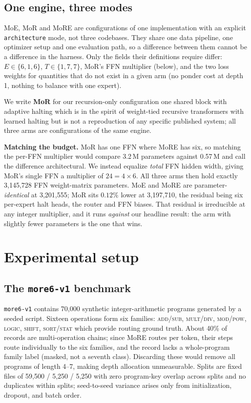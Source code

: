 \documentclass{article}
\begin{document}
\subsection{One engine, three modes}
\label{sec:engine}

MoE, MoR and MoRE are configurations of one implementation with an explicit
\texttt{architecture} mode, not three codebases. They share one data
pipeline, one optimizer setup and one evaluation path, so a difference between
them cannot be a difference in the harness. Only the fields their definitions
require differ: $E \in \{6,1,6\}$, $T \in \{1,7,7\}$, MoR's FFN multiplier
(below), and the two loss weights for quantities that do not exist in a given
arm (no ponder cost at depth 1, nothing to balance with one expert).

We write \textbf{MoR} for our recursion-only configuration  one shared
block with adaptive halting  which is in the spirit of weight-tied
recursive transformers with learned halting
\citep{dehghani2019ut,bae2025mor} but is not a reproduction of any specific
published system; all three arms are configurations of the same engine.

\textbf{Matching the budget.} MoR has one FFN where MoRE has six, so
matching the per-FFN multiplier would compare 3.2\,M parameters against
0.57\,M and call the difference architectural. We instead equalize
\emph{total} FFN hidden width, giving MoR's single FFN a multiplier of
$24 = 4 \times 6$. All three arms then hold exactly 3{,}145{,}728 FFN
weight-matrix parameters. MoE and MoRE are parameter-\emph{identical} at
3{,}201{,}555; MoR sits $0.12\%$ lower at 3{,}197{,}710, the residual being
six per-expert halt heads, the router and FFN biases. That residual is
irreducible at any integer multiplier, and it runs \emph{against} our headline
result: the arm with slightly fewer parameters is the one that wins.

\section{Experimental setup}\label{sec:setup}

\subsection{The \texttt{more6-v1} benchmark}
\label{sec:data}

\texttt{more6-v1} contains 70,000 synthetic integer-arithmetic programs generated by a seeded script. Sixteen operations form six families: \textsc{add/sub}, \textsc{mult/div}, \textsc{mod/pow}, \textsc{logic}, \textsc{shift}, \textsc{sort/stat} which provide routing ground truth. About 40\% of records are multi-operation chains; since MoRE routes per token, their steps route individually to the six families, and the record lacks a whole-program family label (masked, not a seventh class). Discarding these would remove all programs of length 4--7, making depth allocation unmeasurable. Splits are fixed files of 59,500 / 5,250 / 5,250 with zero program-key overlap across splits and no duplicates within splits; seed-to-seed variance arises only from initialization, dropout, and batch order.
\end{document}
